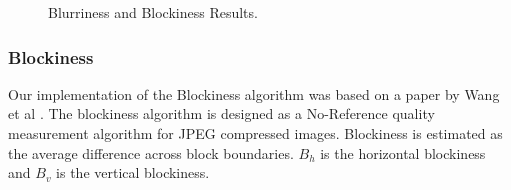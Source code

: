 \begin{figure} [H]
	\centering
	\caption{Blurriness and Blockiness Results.} \label{fig:BlurrBlockExp}	
\end{figure}

\subsubsection{Blockiness}

Our implementation of the Blockiness algorithm was based on a paper by Wang et al \cite{Wang}.  
The blockiness algorithm is designed as a No-Reference quality measurement algorithm for JPEG compressed images.  
Blockiness is estimated as the average difference across block boundaries.  
$B_{h}$ is the horizontal blockiness and $B_{v}$ is the vertical blockiness.

